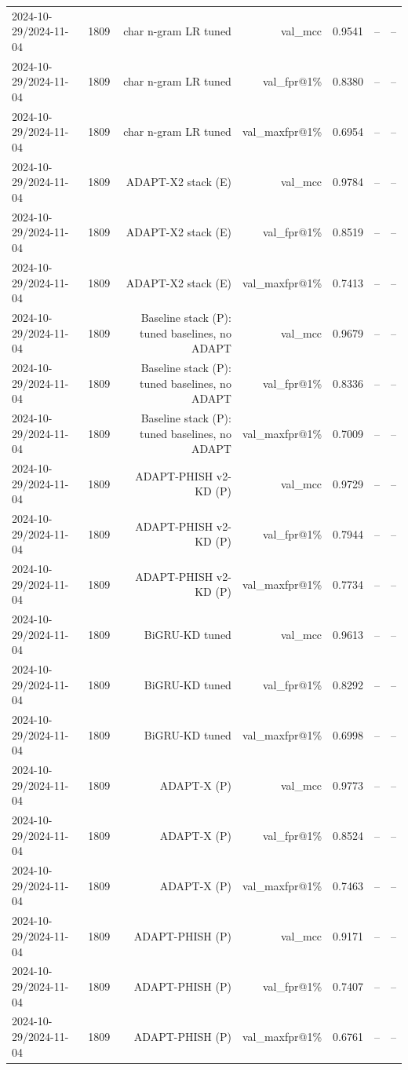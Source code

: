 \begin{table}[t]
\begin{tabular}{llrrrrr}
2024-10-29/2024-11-04 & 1809 & char n-gram LR tuned & val\_mcc & 0.9541 & -- & -- \\
2024-10-29/2024-11-04 & 1809 & char n-gram LR tuned & val\_fpr@1\% & 0.8380 & -- & -- \\
2024-10-29/2024-11-04 & 1809 & char n-gram LR tuned & val\_maxfpr@1\% & 0.6954 & -- & -- \\
2024-10-29/2024-11-04 & 1809 & ADAPT-X2 stack (E) & val\_mcc & 0.9784 & -- & -- \\
2024-10-29/2024-11-04 & 1809 & ADAPT-X2 stack (E) & val\_fpr@1\% & 0.8519 & -- & -- \\
2024-10-29/2024-11-04 & 1809 & ADAPT-X2 stack (E) & val\_maxfpr@1\% & 0.7413 & -- & -- \\
2024-10-29/2024-11-04 & 1809 & Baseline stack (P): tuned baselines, no ADAPT & val\_mcc & 0.9679 & -- & -- \\
2024-10-29/2024-11-04 & 1809 & Baseline stack (P): tuned baselines, no ADAPT & val\_fpr@1\% & 0.8336 & -- & -- \\
2024-10-29/2024-11-04 & 1809 & Baseline stack (P): tuned baselines, no ADAPT & val\_maxfpr@1\% & 0.7009 & -- & -- \\
2024-10-29/2024-11-04 & 1809 & ADAPT-PHISH v2-KD (P) & val\_mcc & 0.9729 & -- & -- \\
2024-10-29/2024-11-04 & 1809 & ADAPT-PHISH v2-KD (P) & val\_fpr@1\% & 0.7944 & -- & -- \\
2024-10-29/2024-11-04 & 1809 & ADAPT-PHISH v2-KD (P) & val\_maxfpr@1\% & 0.7734 & -- & -- \\
2024-10-29/2024-11-04 & 1809 & BiGRU-KD tuned & val\_mcc & 0.9613 & -- & -- \\
2024-10-29/2024-11-04 & 1809 & BiGRU-KD tuned & val\_fpr@1\% & 0.8292 & -- & -- \\
2024-10-29/2024-11-04 & 1809 & BiGRU-KD tuned & val\_maxfpr@1\% & 0.6998 & -- & -- \\
2024-10-29/2024-11-04 & 1809 & ADAPT-X (P) & val\_mcc & 0.9773 & -- & -- \\
2024-10-29/2024-11-04 & 1809 & ADAPT-X (P) & val\_fpr@1\% & 0.8524 & -- & -- \\
2024-10-29/2024-11-04 & 1809 & ADAPT-X (P) & val\_maxfpr@1\% & 0.7463 & -- & -- \\
2024-10-29/2024-11-04 & 1809 & ADAPT-PHISH (P) & val\_mcc & 0.9171 & -- & -- \\
2024-10-29/2024-11-04 & 1809 & ADAPT-PHISH (P) & val\_fpr@1\% & 0.7407 & -- & -- \\
2024-10-29/2024-11-04 & 1809 & ADAPT-PHISH (P) & val\_maxfpr@1\% & 0.6761 & -- & -- \\

\end{tabular}
\end{table}
